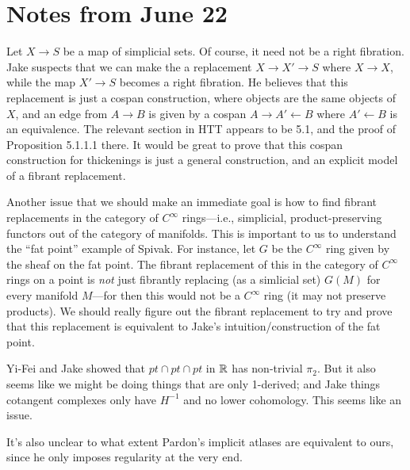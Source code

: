 

\section{Notes from June 22}

Let $X \to S$ be a map of simplicial sets. Of course, it need not be a right fibration. Jake suspects that we can make the a replacement $X \to X' \to S$ where $X \to X$, while the map $X' \to S$ becomes a right fibration. He believes that this replacement is just a cospan construction, where objects are the same objects of $X$, and an edge from $A \to B$ is given by a cospan $A \to A' \leftarrow B$ where $A' \leftarrow B$ is an equivalence. The relevant section in HTT appears to be 5.1, and the proof of Proposition 5.1.1.1 there. It would be great to prove that this cospan construction for thickenings is just a general construction, and an explicit model of a fibrant replacement.

Another issue that we should make an immediate goal is how to find fibrant replacements in the category of $C^\infty$ rings---i.e., simplicial, product-preserving functors out of the category of manifolds. This is important to us to understand the ``fat point'' example of Spivak. For instance, let $G$ be the $C^\infty$ ring given by the sheaf on the fat point. The fibrant replacement of this in the category of $C^\infty$ rings on a point is {\em not} just fibrantly replacing (as a simlicial set) $G(M)$ for every manifold $M$---for then this would not be a $C^\infty$ ring (it may not preserve products). We should really figure out the fibrant replacement to try and prove that this replacement is equivalent to Jake's intuition/construction of the fat point.

Yi-Fei and Jake showed that $pt \cap pt \cap pt$ in $\mathbb R$ has non-trivial $\pi_2$. But it also seems like we might be doing things that are only 1-derived; and Jake things cotangent complexes only have $H^{-1}$ and no lower cohomology. This seems like an issue. 

It's also unclear to what extent Pardon's implicit atlases are equivalent to ours, since he only imposes regularity at the very end.

